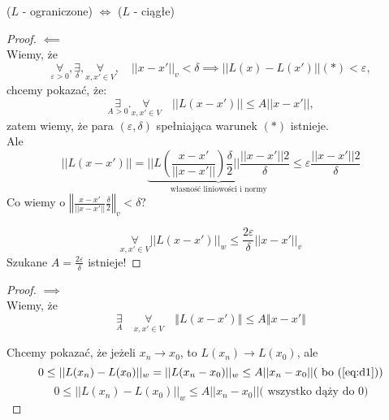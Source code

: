 \documentclass[../main.tex]{subfiles}
\begin{document}
\begin{tw}
    ($L$ - ograniczone) $\iff$ ($L$ - ciągłe)
\end{tw}

\begin{proof}
    $\impliedby$\\
    Wiemy, że
\[
    \underset{\varepsilon > 0}{\forall}, \underset{\delta}{\exists}, \underset{x,x'\in V}{\forall},\quad ||x-x'||_v < \delta \implies ||L(x) - L(x')||(*)< \varepsilon
,\]
chcemy pokazać, że:
\[
    \underset{A>0}{\exists}.\underset{x,x'\in V}{\forall}\quad ||L(x-x')|| \leq A||x-x'||,
\]
zatem wiemy, że para $(\varepsilon, \delta)$ spełniająca warunek $(*)$ istnieje.\\
Ale
    \[
        ||L(x-x')|| = \underbrace{\Bigg |\Bigg |L\left ( \frac{x-x'}{||x-x'||}\right ) \frac{\delta}{2}\Bigg |\Bigg | \frac{||x-x'|| 2}{\delta}}_{\text{własność liniowości i normy}} \leq \varepsilon \frac{||x-x'|| 2}{\delta}
    \]
Co wiemy o $\left\Vert \frac{x-x'}{||x-x'||} \frac{\delta}{2} \right\Vert_v < \delta?$

$$\underset{x,x'\in V}{\forall}||L(x-x')||_w \leq \frac{2 \varepsilon}{\delta} ||x-x'||_v$$
Szukane $A=\frac{2\varepsilon}{\delta}$ istnieje!
\end{proof}

\begin{proof}
    $\implies$\\
Wiemy, że
\begin{equation}\label{eq:d1}
    \underset{A}{\exists}\quad \underset{x,x'\in V}{\forall}\quad \left\Vert L(x-x')\right\Vert \leq A\left\Vert x-x' \right\Vert
\end{equation}

Chcemy pokazać, że jeżeli $x_n\to x_0$, to $L(x_n)\to L(x_0)$, ale
\[
    0 \leq ||L(x_n)-L(x_0)||_w = ||L(x_n-x_0)||_w \leq A||x_n-x_0||(\text{ bo (\ref{eq:d1})})
\]
\[
    0\leq ||L(x_n) - L(x_0)||_w \leq A||x_n - x_0||(\text{ wszystko dąży do 0)}
\]
\end{proof}
\end{document}
